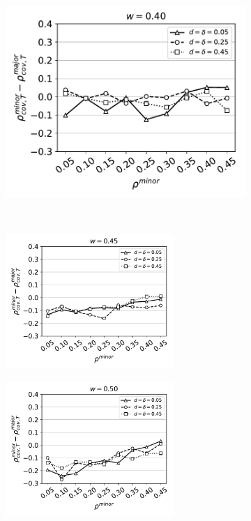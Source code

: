 \begin{figure}[H]
\begin{subfigure}{0.315\textwidth}
    \includegraphics[width=\textwidth]{Figures/full-minority-homophily=0p40.pdf}
  \end{subfigure} \\
  \begin{subfigure}{0.49\textwidth}
    \includegraphics[width=0.7\textwidth]{Figures/full-minority-homophily=0p45.pdf}
  \end{subfigure}
  \begin{subfigure}{0.49\textwidth}
    \includegraphics[width=0.7\textwidth]{Figures/full-minority-homophily=0p50.pdf}
  \end{subfigure}
  \caption{}
  \label{fig:}
\end{figure}
